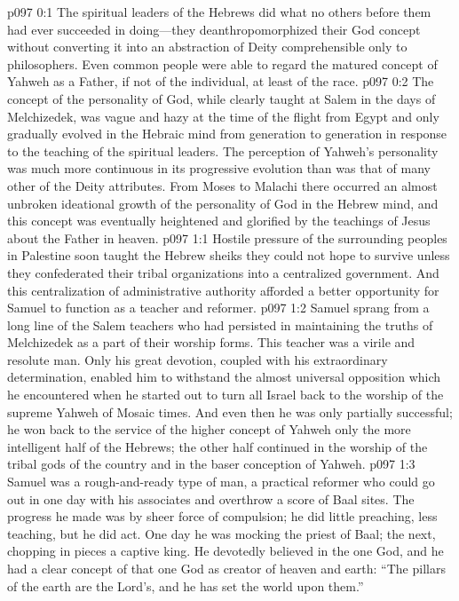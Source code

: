 \author{Melchizedek}
\vs p097 0:1 The spiritual leaders of the Hebrews did what no others before them had ever succeeded in doing---they deanthropomorphized their God concept without converting it into an abstraction of Deity comprehensible only to philosophers. Even common people were able to regard the matured concept of Yahweh as a Father, if not of the individual, at least of the race.
\vs p097 0:2 The concept of the personality of God, while clearly taught at Salem in the days of Melchizedek, was vague and hazy at the time of the flight from Egypt and only gradually evolved in the Hebraic mind from generation to generation in response to the teaching of the spiritual leaders. The perception of Yahweh’s personality was much more continuous in its progressive evolution than was that of many other of the Deity attributes. From Moses to Malachi there occurred an almost unbroken ideational growth of the personality of God in the Hebrew mind, and this concept was eventually heightened and glorified by the teachings of Jesus about the Father in heaven.\plusone
{}%
\vs p097 1:1 Hostile pressure of the surrounding peoples in Palestine soon taught the Hebrew sheiks they could not hope to survive unless they confederated their tribal organizations into a centralized government. And this centralization of administrative authority afforded a better opportunity for Samuel to function as a teacher and reformer.
\vs p097 1:2 Samuel sprang from a long line of the Salem teachers who had persisted in maintaining the truths of Melchizedek as a part of their worship forms. This teacher was a virile and resolute man. Only his great devotion, coupled with his extraordinary determination, enabled him to withstand the almost universal opposition which he encountered when he started out to turn all Israel back to the worship of the supreme Yahweh of Mosaic times. And even then he was only partially successful; he won back to the service of the higher concept of Yahweh only the more intelligent half of the Hebrews; the other half continued in the worship of the tribal gods of the country and in the baser conception of Yahweh.
\vs p097 1:3 Samuel was a rough\hyp{}and\hyp{}ready type of man, a practical reformer who could go out in one day with his associates and overthrow a score of Baal sites. The progress he made was by sheer force of compulsion; he did little preaching, less teaching, but he did act. One day he was mocking the priest of Baal; the next, chopping in pieces a captive king. He devotedly believed in the one God, and he had a clear concept of that one God as creator of heaven and earth: “The pillars of the earth are the Lord’s, and he has set the world upon them.”
